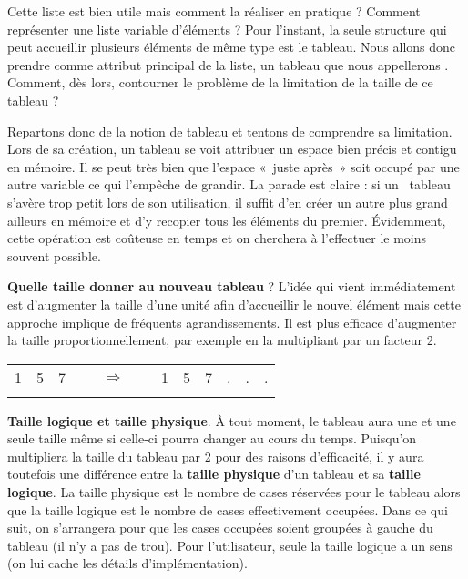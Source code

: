 Cette liste est bien utile mais comment la réaliser en pratique ?
Comment représenter une liste variable d’éléments ? Pour
l'instant, la seule structure qui peut accueillir
plusieurs éléments de même type est le tableau. Nous allons donc
prendre comme attribut principal de la liste, un tableau que nous
appellerons . Comment, dès lors, contourner
le problème de la limitation de la taille de ce tableau ?

Repartons donc de la notion de tableau et tentons de comprendre sa
limitation. Lors de sa création, un tableau se voit attribuer un espace
bien précis et contigu en mémoire. Il se peut très bien que
l'espace «~juste après~» soit occupé par une autre
variable ce qui l'empêche de grandir. La parade est
claire : si un \ tableau s’avère trop petit lors de son utilisation, il
suffit d’en créer un autre plus grand ailleurs en mémoire et d’y
recopier tous les éléments du premier. Évidemment, cette opération est
coûteuse en temps et on cherchera à l’effectuer le moins souvent
possible.

\textbf{Quelle taille donner au nouveau tableau} ? L’idée qui vient
immédiatement est d’augmenter la taille d’une unité afin d’accueillir
le nouvel élément mais cette approche implique de fréquents
agrandissements. Il est plus efficace d’augmenter la taille
proportionnellement, par exemple en la multipliant par un facteur 2.

\begin{center}
\tablehead{}
\begin{supertabular}{|m{0.259cm}|m{0.259cm}|m{0.259cm}|m{0.087999985cm}m{0.46000004cm}m{0.087999985cm}|m{0.25300002cm}|m{0.259cm}|m{0.259cm}|m{0.15299998cm}|m{0.15299998cm}|m{0.17cm}|}
\hhline{---~~~------}
 1 &
 5 &
 7 &
~
 &
 ${\Rightarrow}$ &
~
 &
 1 &
 5 &
 7 &
 . &
 . &
 .\\\hhline{---~~~------}
\end{supertabular}
\end{center}


\textbf{Taille logique et taille physique}. À tout moment, le tableau
aura une et une seule taille même si celle-ci pourra changer au cours
du temps. Puisqu’on multipliera la taille du tableau par 2 pour des
raisons d’efficacité, il y aura toutefois une différence entre la
\textbf{taille physique} d’un tableau et sa \textbf{taille logique}. La
taille physique est le nombre de cases réservées pour le tableau alors
que la taille logique est le nombre de cases effectivement occupées.
Dans ce qui suit, on s'arrangera pour que les cases
occupées soient groupées à gauche du tableau (il n'y a
pas de trou). Pour l’utilisateur, seule la taille logique a un sens (on
lui cache les détails d’implémentation).



